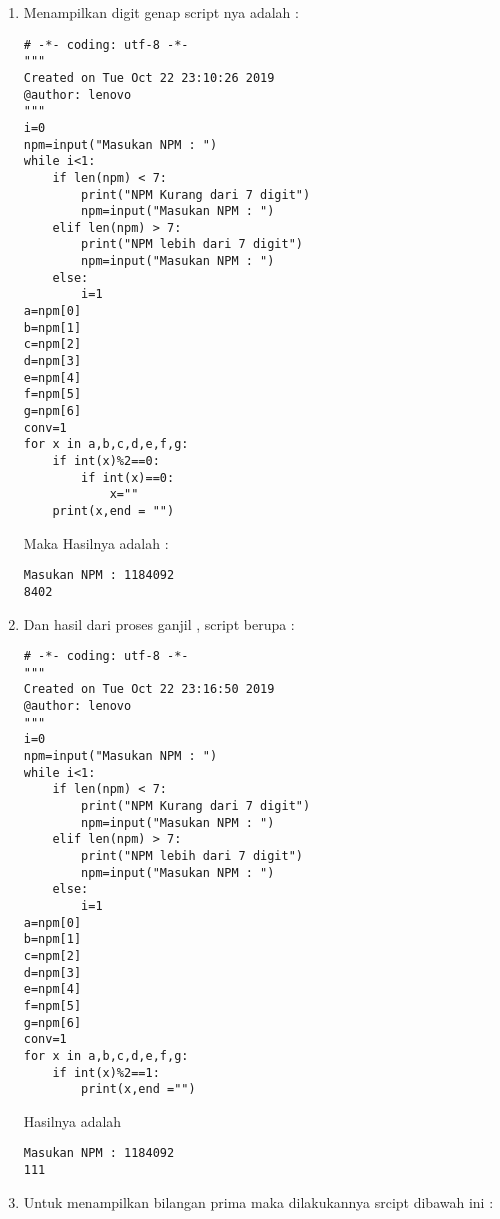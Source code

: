 \begin{enumerate}
\begin{verbatim}
# -*- coding: utf-8 -*-
"""
Created on Tue Oct 22 21:13:37 2019
@author: lenovo
"""
i=0
npm=input("Masukan NPM : ")
while i<1:
    if len(npm) < 7:
        print("NPM Kurang dari 7 digit")
        npm=input("Masukan NPM : ")
    elif len(npm) > 7:
        print("NPM lebih dari 7 digit")
        npm=input("Masukan NPM : ")
    else:
        i=1
a=npm[0]
b=npm[1]
c=npm[2]
d=npm[3]
e=npm[4]
f=npm[5]
g=npm[6]
for x in a,b,c,d,e,f,g:
    print(x)
\end{verbatim}
Maka Hasilnya adalah : 
\begin{verbatim}
Masukan NPM : 1184092
1
1
8
4
0
9
2
\end{verbatim}
\item
Menampilkan digit genap script nya adalah : 
\begin{verbatim}
# -*- coding: utf-8 -*-
"""
Created on Tue Oct 22 23:10:26 2019
@author: lenovo
"""
i=0
npm=input("Masukan NPM : ")
while i<1:
    if len(npm) < 7:
        print("NPM Kurang dari 7 digit")
        npm=input("Masukan NPM : ")
    elif len(npm) > 7:
        print("NPM lebih dari 7 digit")
        npm=input("Masukan NPM : ")
    else:
        i=1
a=npm[0]
b=npm[1]
c=npm[2]
d=npm[3]
e=npm[4]
f=npm[5]
g=npm[6]
conv=1
for x in a,b,c,d,e,f,g:
    if int(x)%2==0:
        if int(x)==0:
            x=""
    print(x,end = "")
\end{verbatim}
Maka Hasilnya adalah :
\begin{verbatim}
Masukan NPM : 1184092
8402
\end{verbatim}
\item
Dan hasil dari proses ganjil , script berupa :
\begin{verbatim}
# -*- coding: utf-8 -*-
"""
Created on Tue Oct 22 23:16:50 2019
@author: lenovo
"""
i=0
npm=input("Masukan NPM : ")
while i<1:
    if len(npm) < 7:
        print("NPM Kurang dari 7 digit")
        npm=input("Masukan NPM : ")
    elif len(npm) > 7:
        print("NPM lebih dari 7 digit")
        npm=input("Masukan NPM : ")
    else:
        i=1
a=npm[0]
b=npm[1]
c=npm[2]
d=npm[3]
e=npm[4]
f=npm[5]
g=npm[6]
conv=1
for x in a,b,c,d,e,f,g:
    if int(x)%2==1:
        print(x,end ="")
\end{verbatim}
Hasilnya adalah 
\begin{verbatim}
Masukan NPM : 1184092
111
\end{verbatim}
\item 
Untuk menampilkan bilangan prima maka dilakukannya srcipt dibawah ini :
\begin{verbatim}

\end{verbatim}
\end{enumerate}
